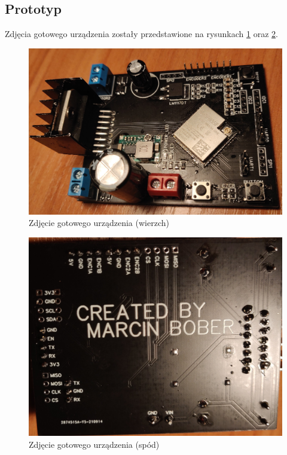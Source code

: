     
    \subsection{Prototyp}
    Zdjęcia  gotowego urządzenia zostały przedstawione na rysunkach \ref{fig:prototype_real_1} oraz \ref{fig:prototype_real_2}.
    
    \begin{figure}[ht]
        \centering
        \includegraphics[height=0.4\textheight]{img/prototype_real_1.jpg}
        \caption{Zdjęcie gotowego urządzenia (wierzch)}
        \label{fig:prototype_real_1}
    \end{figure}
    
    \begin{figure}[ht]
        \centering
        \includegraphics[height=0.45\textheight]{img/prototype_real_2.jpg}
        \caption{Zdjęcie gotowego urządzenia (spód)}
        \label{fig:prototype_real_2}
    \end{figure}
